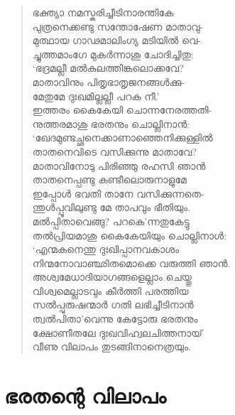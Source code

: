 \begin{verse}
ഭക്ത്യാ നമസ്കരിച്ചീടിനാരന്തികേ\\
പുത്രനെക്കണ്ടു സന്തോഷേണ മാതാവു-\\
മുത്ഥായ ഗാഢമാലിംഗ്യ മടിയില്‍ വെ-\\
ച്ചുത്തമാംഗേ മുകര്‍ന്നാശു ചോദിച്ചിതു:\\
‘ഭദ്രമല്ലീ മല്‍കുലത്തിങ്കലൊക്കവേ?\\
മാതാവിനും പിതൃഭാതൃജനങ്ങള്‍ക്കു-\\
മേതുമേ ദുഃഖമില്ലല്ലീ പറക നീ.’\\
ഇത്തരം കൈകേയി ചൊന്നനേരത്തതി-\\
നുത്തരമാശു ഭരതനും ചൊല്ലിനാന്‍:\\
‘ഖേദമുണ്ടച്ഛനെക്കാണാഞ്ഞെനിക്കുള്ളില്‍\\
താതനെവിടെ വസിക്കുന്നു മാതാവേ?\\
മാതാവിനോടു പിരിഞ്ഞു രഹസി ഞാന്‍\\
താതനെപ്പണ്ടു കണ്ടീലൊരുനാളുമേ\\
ഇപ്പോള്‍ ഭവതി താനേ വസിക്കുന്നതെ-\\
ന്തുള്‍പ്പൂവിലുണ്ടു മേ താപവും ഭീതിയും.\\
മല്‍പ്പിതാവെങ്ങു? പറകെ’ന്നതുകേട്ടു\\
തല്‍പ്രിയമാശു കൈകേയിയും ചൊല്ലിനാള്‍:\\
‘എന്മകനെന്തു ദുഃഖിപ്പാനവകാശം\\
നിന്മനോവാഞ്ഛിതമൊക്കെ വരുത്തി ഞാന്‍.\\
അശ്വമേധാദിയാഗങ്ങളെല്ലാം ചെയ്തു\\
വിശ്വമെല്ലാടവും കീര്‍ത്തി പരത്തിയ\\
സല്‍പ്പുരുഷന്മാര്‍ ഗതി ലഭിച്ചീടിനാന്‍\\
ത്വല്‍പിതാ’വെന്നു കേട്ടോരു ഭരതനും\\
ക്ഷോണീതലേ ദുഃഖവിഹ്വലചിത്തനായ്\\
വീണു വിലാപം തുടങ്ങിനാനെത്രയും.
\end{verse}


\section{ഭരതന്റെ വിലാപം}

